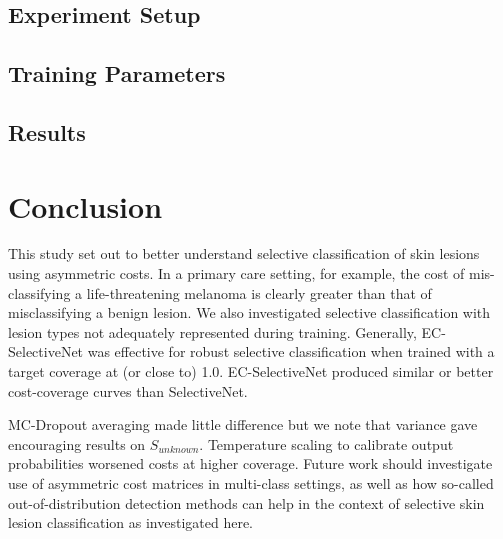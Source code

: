\subsection{Experiment Setup}

\subsection{Training Parameters}

\subsection{Results}



\section{Conclusion}
\label{sec:selective_conclusion}
This study set out to better understand selective classification of skin lesions using asymmetric costs. In a primary care setting, for example, the cost of mis-classifying a life-threatening melanoma is clearly greater than that of misclassifying a benign lesion. We also investigated selective classification with lesion types not adequately represented during training. Generally, EC-SelectiveNet was effective for robust selective classification when trained with a target coverage at (or close to) 1.0. EC-SelectiveNet produced similar or better cost-coverage curves than SelectiveNet.

MC-Dropout averaging made little difference but we note that variance gave encouraging results on \(S_{unknown}\). Temperature scaling to calibrate output probabilities worsened costs at higher coverage. Future work should investigate use of asymmetric cost matrices in multi-class settings, as well as how so-called out-of-distribution detection methods can help in the context of selective skin lesion classification as investigated here.